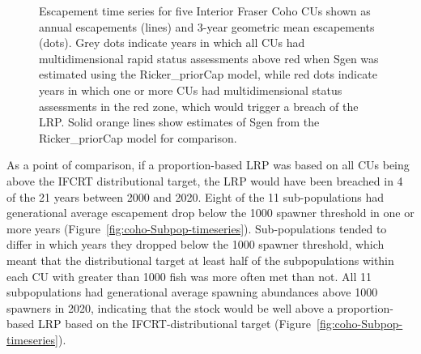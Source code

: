 \documentclass[11pt]{book}
\begin{document}
\begin{figure}[htb]

{\centering {} 

}

\caption{Escapement time series for five Interior Fraser Coho CUs shown as annual escapements (lines) and 3-year geometric mean escapements (dots). Grey dots indicate years in which all CUs had multidimensional rapid status assessments above red when Sgen was estimated using the Ricker\_priorCap model, while red dots indicate years in which one or more CUs had multidimensional status assessments in the red zone, which would trigger a breach of the LRP. Solid orange lines show estimates of Sgen from the Ricker\_priorCap model for comparison.}\label{fig:coho-CU-multiDim-Ricker-Cap}
\end{figure}
As a point of comparison, if a proportion-based LRP was based on all CUs being above the IFCRT distributional target, the LRP would have been breached in 4 of the 21 years between 2000 and 2020. Eight of the 11 sub-populations had generational average escapement drop below the 1000 spawner threshold in one or more years (Figure~\ref{fig:coho-Subpop-timeseries}). Sub-populations tended to differ in which years they dropped below the 1000 spawner threshold, which meant that the distributional target at least half of the subpopulations within each CU with greater than 1000 fish was more often met than not. All 11 subpopulations had generational average spawning abundances above 1000 spawners in 2020, indicating that the stock would be well above a proportion-based LRP based on the IFCRT-distributional target (Figure~\ref{fig:coho-Subpop-timeseries}).
\end{document}
